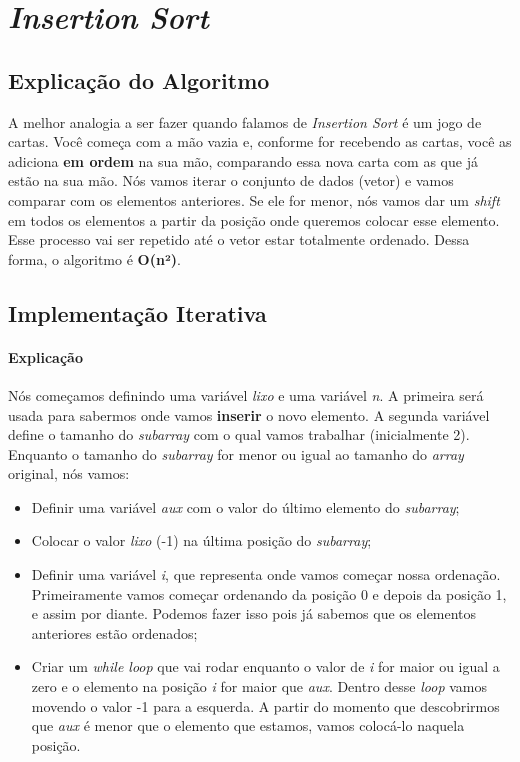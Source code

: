 \section{\textit{Insertion Sort}}

\subsection{Explicação do Algoritmo}
A melhor analogia a ser fazer quando falamos de \textit{Insertion Sort} é um jogo de cartas. Você começa com a mão vazia e, conforme for recebendo as cartas, você as adiciona
\textbf{em ordem} na sua mão, comparando essa nova carta com as que já estão na sua mão. Nós vamos iterar o conjunto de dados (vetor) e vamos comparar com os elementos anteriores.
Se ele for menor, nós vamos dar um \textit{shift} em todos os elementos a partir da posição onde queremos colocar esse elemento. Esse processo vai ser repetido até o vetor estar
totalmente ordenado. Dessa forma, o algoritmo é \textbf{O(n²)}.

\subsection{Implementação Iterativa}
\paragraph{Explicação}
Nós começamos definindo uma variável \textit{lixo} e uma variável \textit{n}. A primeira será usada para sabermos onde vamos \textbf{inserir} o novo elemento. A segunda
variável define o tamanho do \textit{subarray} com o qual vamos trabalhar (inicialmente 2). Enquanto o tamanho do \textit{subarray} for menor ou igual ao tamanho do \textit{array} original, nós vamos:
\begin{itemize}
  \item Definir uma variável \textit{aux} com o valor do último elemento do \textit{subarray};
  \item Colocar o valor \textit{lixo} (-1) na última posição do \textit{subarray};
  \item Definir uma variável \textit{i}, que representa onde vamos começar nossa ordenação. Primeiramente vamos começar ordenando da posição 0 e depois da posição 1, e assim por diante.
    Podemos fazer isso pois já sabemos que os elementos anteriores estão ordenados;
  \item Criar um \textit{while loop} que vai rodar enquanto o valor de \textit{i} for maior ou igual a zero e o elemento na posição \textit{i} for maior que \textit{aux}. Dentro desse \textit{loop}
    vamos movendo o valor -1 para a esquerda. A partir do momento que descobrirmos que \textit{aux} é menor que o elemento que estamos, vamos colocá-lo naquela posição.
\end{itemize}

